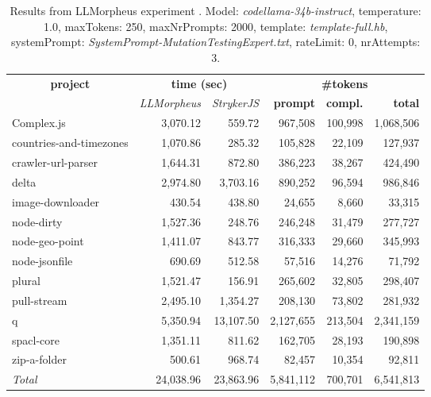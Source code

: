 
\begin{table*}[hbt!]
\centering
{\scriptsize
\begin{tabular}{l||r|r|r|r|r}
\multicolumn{1}{c|}{\bf project} & \multicolumn{2}{|c|}{\bf time (sec)} & \multicolumn{3}{|c|}{\bf \#tokens} \\
               & {\it LLMorpheus} & {\it StrykerJS} & {\bf prompt} & {\bf compl.} & {\bf total} \\
\hline
  Complex.js & 3,070.12 & 559.72 & 967,508 & 100,998 & 1,068,506 \\ 
countries-and-timezones & 1,070.86 & 285.32 & 105,828 & 22,109 & 127,937 \\ 
crawler-url-parser & 1,644.31 & 872.80 & 386,223 & 38,267 & 424,490 \\ 
delta & 2,974.80 & 3,703.16 & 890,252 & 96,594 & 986,846 \\ 
image-downloader & 430.54 & 438.80 & 24,655 & 8,660 & 33,315 \\ 
node-dirty & 1,527.36 & 248.76 & 246,248 & 31,479 & 277,727 \\ 
node-geo-point & 1,411.07 & 843.77 & 316,333 & 29,660 & 345,993 \\ 
node-jsonfile & 690.69 & 512.58 & 57,516 & 14,276 & 71,792 \\ 
plural & 1,521.47 & 156.91 & 265,602 & 32,805 & 298,407 \\ 
pull-stream & 2,495.10 & 1,354.27 & 208,130 & 73,802 & 281,932 \\ 
q & 5,350.94 & 13,107.50 & 2,127,655 & 213,504 & 2,341,159 \\ 
spacl-core & 1,351.11 & 811.62 & 162,705 & 28,193 & 190,898 \\ 
zip-a-folder & 500.61 & 968.74 & 82,457 & 10,354 & 92,811 \\ 
\hline
  \textit{Total} & 24,038.96 & 23,863.96 & 5,841,112 & 700,701 & 6,541,813 \\
  \end{tabular}
  }
  \\[2mm]
  \caption{Results from LLMorpheus experiment .
    Model: \textit{codellama-34b-instruct}, 
    temperature: 1.0, 
    maxTokens: 250, 
    maxNrPrompts: 2000, 
    template: \textit{template-full.hb}, 
    systemPrompt: \textit{SystemPrompt-MutationTestingExpert.txt}, 
    rateLimit: 0, 
    nrAttempts: 3.  
  }
  \label{table:Cost:run345:codellama-34b-instruct:template-full.hb:1.0}
\end{table*}